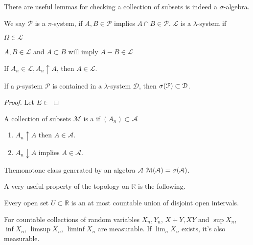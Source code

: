 There are useful lemmas for checking a collection of subsets is indeed a \(\sigma\)-algebra. 

We say \(\mathcal{P}\) is a \(\pi\)-system, if \(A,B\in \mathcal{P}\) implies \(A\cap B \in \mathcal{P}\). \(\mathcal{L}\) is a \(\lambda\)-system if \begin{enumerate*} 
    \item \(\Omega\in \mathcal{L}\)
    \item \(A,B \in \mathcal{L}\) and \(A\subset B\) will imply \(A - B \in \mathcal{L}\)
    \item If \(A_{n}\in \mathcal{L}, A_{n}\uparrow A\), then \(A\in \mathcal{L}\).
\end{enumerate*} 

\begin{lemma}
    If a \(p\)-system \(\mathcal{P}\) is contained in a \(\lambda\)-system \(\mathcal{D}\), then \(\sigma\pqty{\mathcal{P}} \subset \mathcal{D}\).
\end{lemma}
\begin{proof}
    Let \(E\in \mathcal{}\)
\end{proof}

\begin{lemma}
    A collection of subsets \(\mathcal{M}\) is a   if \((A_{n})\subset \mathcal{A}\)
    \begin{enumerate}
        \item \(A_{n} \uparrow A\) then \(A \in \mathcal{A}\).
        \item \(A_{n} \downarrow A\) implies \(A \in \mathcal{A}\). 
    \end{enumerate}
    The{monotone class} generated by an algebra \(\mathcal{A}\)  \(\mathcal{M}(\mathcal{A}) = \sigma\pqty{\mathcal{A}}\). 
\end{lemma}

A very useful property of the topology on \(\mathbb{R}\) is the following. 
\begin{thm}
    Every open set \(U \subset \mathbb{R}\) is an at most countable union of disjoint open intervals. 
\end{thm}

\begin{thm}[Measurability]
    For countable collections of random variables \(X_{n}, Y_{n}\), \(X +Y, XY\) and \(\sup X_{n}\), \( \inf X_{n}\), \( \limsup X_{n}\), \( \liminf X_{n}\) are measurable. If \(\lim_{n} X_{n}\) exists, it's also measurable.
\end{thm}

